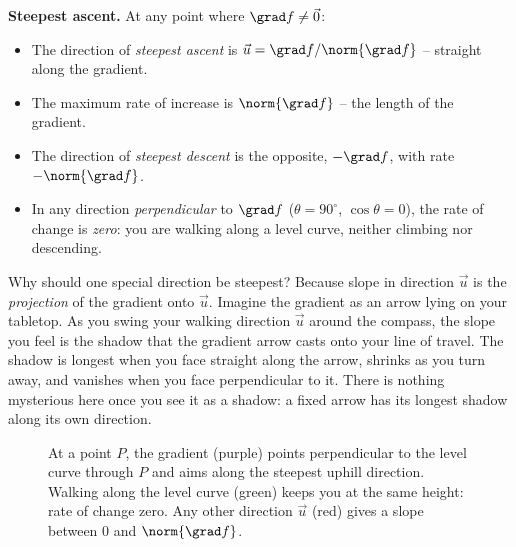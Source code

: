 \begin{focusbox}
\textbf{Steepest ascent.} At any point where $\grad f\neq \vec 0$:
\begin{itemize}
\item The direction of \emph{steepest ascent} is $\vec u = \grad f / \norm{\grad
f}$ -- straight along the gradient.
\item The maximum rate of increase is $\norm{\grad f}$ -- the length of the
gradient.
\item The direction of \emph{steepest descent} is the opposite, $-\grad f$, with
rate $-\norm{\grad f}$.
\item In any direction \emph{perpendicular} to $\grad f$ ($\theta=90^\circ$,
$\cos\theta=0$), the rate of change is \emph{zero}: you are walking along a level
curve, neither climbing nor descending.
\end{itemize}
\end{focusbox}

\begin{intuitionbox}
Why should one special direction be steepest? Because slope in direction $\vec u$
is the \emph{projection} of the gradient onto $\vec u$. Imagine the gradient as an
arrow lying on your tabletop. As you swing your walking direction $\vec u$ around
the compass, the slope you feel is the shadow that the gradient arrow casts onto
your line of travel. The shadow is longest when you face straight along the arrow,
shrinks as you turn away, and vanishes when you face perpendicular to it. There is
nothing mysterious here once you see it as a shadow: a fixed arrow has its longest
shadow along its own direction.
\end{intuitionbox}

\begin{figure}[H]
\centering
{}
\caption{At a point $P$, the gradient (purple) points perpendicular to the level
curve through $P$ and aims along the steepest uphill direction. Walking along the
level curve (green) keeps you at the same height: rate of change zero. Any other
direction $\vec u$ (red) gives a slope between $0$ and $\norm{\grad f}$.}
\label{ch33:fig-steepest}
\end{figure}

